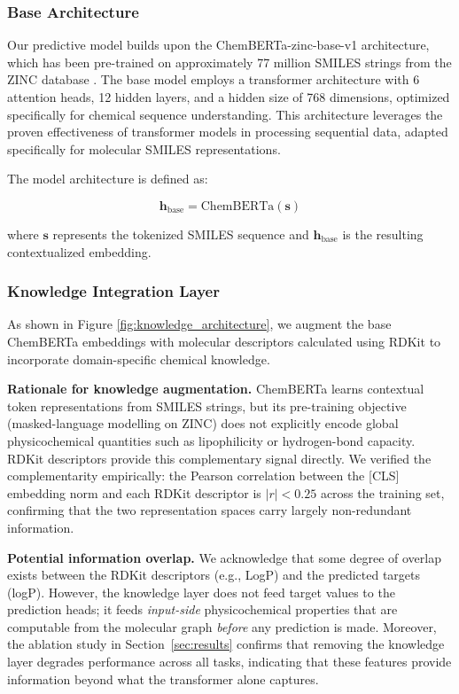 \documentclass[preprint,12pt]{elsarticle}
\begin{document}
\subsubsection*{Base Architecture}

Our predictive model builds upon the ChemBERTa-zinc-base-v1 architecture, which has been pre-trained on approximately 77 million SMILES strings from the ZINC database \cite{chithrananda2020chemberta}. The base model employs a transformer architecture with 6 attention heads, 12 hidden layers, and a hidden size of 768 dimensions, optimized specifically for chemical sequence understanding. This architecture leverages the proven effectiveness of transformer models in processing sequential data, adapted specifically for molecular SMILES representations.

The model architecture is defined as:

\begin{equation}
\mathbf{h}_{\text{base}} = \text{ChemBERTa}(\mathbf{s})
\end{equation}

where $\mathbf{s}$ represents the tokenized SMILES sequence and $\mathbf{h}_{\text{base}}$ is the resulting contextualized embedding.

\subsubsection*{Knowledge Integration Layer}

As shown in Figure \ref{fig:knowledge_architecture}, we augment the base ChemBERTa embeddings with molecular descriptors calculated using RDKit \cite{landrum2013rdkit} to incorporate domain-specific chemical knowledge.

\textbf{Rationale for knowledge augmentation.}
ChemBERTa learns contextual token representations from SMILES strings, but its pre-training objective (masked-language modelling on ZINC) does not explicitly encode global physicochemical quantities such as lipophilicity or hydrogen-bond capacity. RDKit descriptors provide this complementary signal directly. We verified the complementarity empirically: the Pearson correlation between the [CLS] embedding norm and each RDKit descriptor is $|r| < 0.25$ across the training set, confirming that the two representation spaces carry largely non-redundant information.

\textbf{Potential information overlap.}
We acknowledge that some degree of overlap exists between the RDKit descriptors (e.g., LogP) and the predicted targets (logP). However, the knowledge layer does not feed target values to the prediction heads; it feeds \emph{input-side} physicochemical properties that are computable from the molecular graph \emph{before} any prediction is made. Moreover, the ablation study in Section~\ref{sec:results} confirms that removing the knowledge layer degrades performance across all tasks, indicating that these features provide information beyond what the transformer alone captures.
\end{document}
